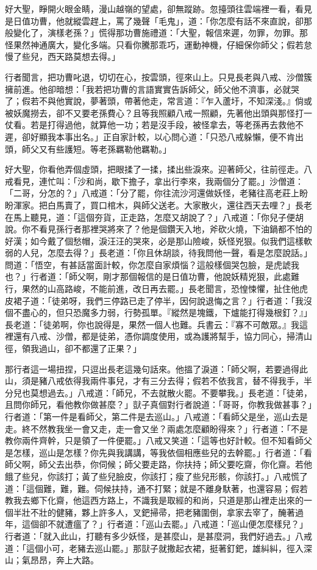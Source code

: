 好大聖，睜開火眼金睛，漫山越嶺的望處，卻無蹤跡。忽擡頭往雲端裡一看，看見是日值功曹，他就縱雲趕上，罵了幾聲「毛鬼」，道：「你怎麼有話不來直說，卻那般變化了，演樣老孫？」慌得那功曹施禮道：「大聖，報信來遲，勿罪，勿罪。那怪果然神通廣大，變化多端。只看你騰那乖巧，運動神機，仔細保你師父；假若怠慢了些兒，西天路莫想去得。」

行者聞言，把功曹叱退，切切在心，按雲頭，徑來山上。只見長老與八戒、沙僧簇擁前進。他卻暗想：「我若把功曹的言語實實告訴師父，師父他不濟事，必就哭了；假若不與他實說，夢著頭，帶著他走，常言道：『乍入蘆圩，不知深淺。』倘或被妖魔撈去，卻不又要老孫費心？且等我照顧八戒一照顧，先著他出頭與那怪打一仗看。若是打得過他，就算他一功；若是沒手段，被怪拿去，等老孫再去救他不遲，卻好顯我本事出名。」正自家計較，以心問心道：「只恐八戒躲懶，便不肯出頭，師父又有些護短。等老孫羈勒他羈勒。」

好大聖，你看他弄個虛頭，把眼揉了一揉，揉出些淚來。迎著師父，往前徑走。八戒看見，連忙叫：「沙和尚，歇下擔子，拿出行李來，我兩個分了罷。」沙僧道：「二哥，分怎的？」八戒道：「分了罷，你往流沙河還做妖怪，老豬往高老莊上盼盼渾家。把白馬賣了，買口棺木，與師父送老。大家散火，還往西天去哩？」長老在馬上聽見，道：「這個夯貨，正走路，怎麼又胡說了？」八戒道：「你兒子便胡說。你不看見孫行者那裡哭將來了？他是個鑽天入地，斧砍火燒，下油鍋都不怕的好漢；如今戴了個愁帽，淚汪汪的哭來，必是那山險峻，妖怪兇狠。似我們這樣軟弱的人兒，怎麼去得？」長老道：「你且休胡談，待我問他一聲，看是怎麼說話。」問道：「悟空，有甚話當面計較，你怎麼自家煩惱？這般樣個哭包臉，是虎諕我也？」行者道：「師父啊，剛才那個報信的是日值功曹，他說妖精兇狠，此處難行，果然的山高路峻，不能前進，改日再去罷。」長老聞言，恐惶悚懼，扯住他虎皮裙子道：「徒弟呀，我們三停路已走了停半，因何說退悔之言？」行者道：「我沒個不盡心的，但只恐魔多力弱，行勢孤單。『縱然是塊鐵，下爐能打得幾根釘？』」長老道：「徒弟啊，你也說得是，果然一個人也難。兵書云：『寡不可敵眾。』我這裡還有八戒、沙僧，都是徒弟，憑你調度使用，或為護將幫手，協力同心，掃清山徑，領我過山，卻不都還了正果？」

那行者這一場扭捏，只逗出長老這幾句話來。他搵了淚道：「師父啊，若要過得此山，須是豬八戒依得我兩件事兒，才有三分去得；假若不依我言，替不得我手，半分兒也莫想過去。」八戒道：「師兄，不去就散火罷。不要攀我。」長老道：「徒弟，且問你師兄，看他教你做甚麼？」獃子真個對行者說道：「哥哥，你教我做甚事？」行者道：「第一件是看師父，第二件是去巡山。」八戒道：「看師父是坐，巡山去是走。終不然教我坐一會又走，走一會又坐？兩處怎麼顧盼得來？」行者道：「不是教你兩件齊幹，只是領了一件便罷。」八戒又笑道：「這等也好計較。但不知看師父是怎樣，巡山是怎樣？你先與我講講，等我依個相應些兒的去幹罷。」行者道：「看師父啊，師父去出恭，你伺候；師父要走路，你扶持；師父要吃齋，你化齋。若他餓了些兒，你該打；黃了些兒臉皮，你該打；瘦了些兒形骸，你該打。」八戒慌了道：「這個難，難，難。伺候扶持，通不打緊；就是不離身馱著，也還容易；假若教我去鄉下化齋，他這西方路上，不識我是取經的和尚，只道是那山裡走出來的一個半壯不壯的健豬，夥上許多人，叉鈀掃帚，把老豬圍倒，拿家去宰了，醃著過年，這個卻不就遭瘟了？」行者道：「巡山去罷。」八戒道：「巡山便怎麼樣兒？」行者道：「就入此山，打聽有多少妖怪，是甚麼山，是甚麼洞，我們好過去。」八戒道：「這個小可，老豬去巡山罷。」那獃子就撒起衣裙，挺著釘鈀，雄糾糾，徑入深山；氣昂昂，奔上大路。

